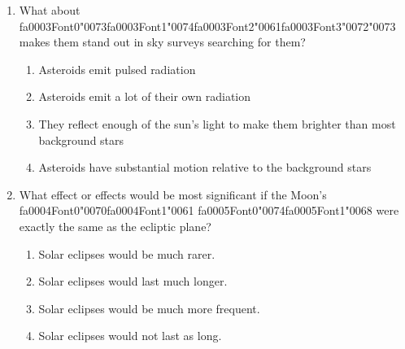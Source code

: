 \documentclass[12pt]{article}
\begin{document}
\begin{enumerate}[label=\arabic*.]
\begin{enumerate}[label=(\alph*)]
    \item Amino acids with a preferred orientation or "chirality"
\end{enumerate}
\item What about {\csname fa0003Font0\endcsname\char"0073}{\csname fa0003Font1\endcsname\char"0074}{\csname fa0003Font2\endcsname\char"0061}{\csname fa0003Font3\endcsname\char"0072}{\char"0073} makes them stand out in sky surveys searching for them?
\begin{enumerate}[label=(\alph*)]
    \item Asteroids emit pulsed radiation
    \item Asteroids emit a lot of their own radiation
    \item They reflect enough of the sun's light to make them brighter than most background stars
    \item Asteroids have substantial motion relative to the background stars
\end{enumerate}
\item What effect or effects would be most significant if the Moon's {\csname fa0004Font0\endcsname\char"0070}{\csname fa0004Font1\endcsname\char"0061} {\csname fa0005Font0\endcsname\char"0074}{\csname fa0005Font1\endcsname\char"0068} were exactly
the same as the ecliptic plane?
\begin{enumerate}[label=(\alph*)]
    \item Solar eclipses would be much rarer.
    \item Solar eclipses would last much longer.
    \item Solar eclipses would be much more frequent.
    \item Solar eclipses would not last as long.
\end{enumerate}
\end{enumerate}
\end{document}
